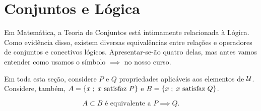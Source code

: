 \section{Conjuntos e Lógica}

Em Matemática, a Teoria de Conjuntos está intimamente relacionada à Lógica.
Como evidência disso, existem diversas equivalências entre relações e operadores de conjuntos e conectivos lógicos.
Apresentar-se-ão quatro delas, mas antes vamos entender como usamos o símbolo $ \implies$ no nosso curso.

\begin{remark}
Em toda esta seção, considere $P$ e $Q$ propriedades aplicáveis aos elementos de $\mathcal{U}$.
Considere, também, $A = \left\{ x \;;\; x \text{ satisfaz } P\right\}$ e $B= \left\{ x \;;\; x \text{ satisfaz } Q\right\}$.
\end{remark}

\begin{comment}
Em Lógica Proposicional, a implicação $\prn \to $ é um operador lógico. 
Para que uma implicação seja aplicada ela precisa de duas proposições $P$ e $Q$, 
onde cada uma pode ser verdadeira ou falsa.
A validade da implicação $P \to Q$ é definida através da seguinte tabela, que chamamos de \textdef{tabela verdade}.

<INSERIR A TABELA VERDADE DE $P \to Q$ AQUI.

Em nosso texto, interpretamos o $P$ como a hipótese do meu problema e $Q$ como a tese em uma implicação.
Essa implicação aparece textualmente de algumas maneiras, a mais comum delas é ``Se $P$, então $Q$'' 
e, em símbolos, escrevemos $P \implies Q$.

Quando queremos provar a validade desse tipo de afirmação, 
tomamos nossa hipótese $P$ como uma propriedade verdadeira, 
o que faz considerarmos somente as duas primeiras linhas da tabela verdade de $P \to Q$.
Dessa maneira, a afirmação ``Se $P$, então $Q$'' é verdadeira se conseguirmos provar que a tese $Q$ também é verdadeira.

Quando já está provado que ``Se $P$, então $Q$'' é verdadeira, 
utilizamos esse resultado para concluir que $Q$ é verdadeira quando temos que $P$ é verdadeira, 
pois, novamente olhando somente para as duas primeiras linhas de $P \to Q$, 
a única opção que temos, quando $P \to Q$ e $P$ são verdadeiras, é que $Q$ também seja verdadeira.
\end{comment}

\begin{equivalence} 
$$ A \subset B \text{ é equivalente a } P \implies Q \text{.} $$
\end{equivalence}

